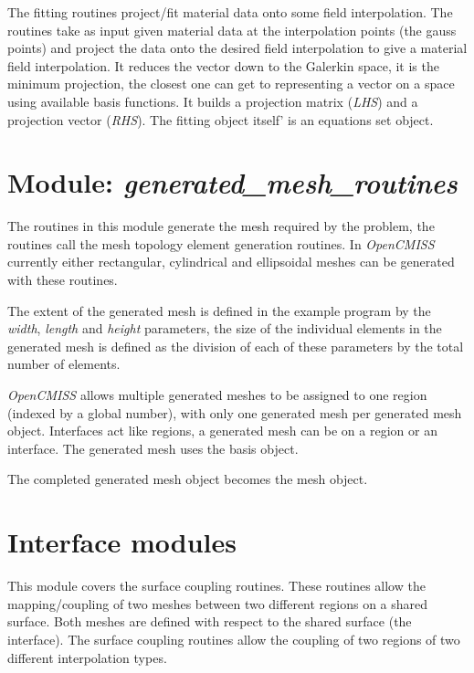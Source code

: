 The fitting routines project/fit material data onto some field interpolation.
The routines take as input given material data at the interpolation points (the
gauss points) and project the data onto the desired field interpolation to give
a material field interpolation. It reduces the vector down to the Galerkin
space, it is the minimum projection, the closest one can get to representing a 
vector on a space using available basis functions. It builds a projection matrix 
(\emph{LHS}) and a projection vector (\emph{RHS}). The fitting object itself' 
is an equations set object.


\section{Module: \emph{generated\_mesh\_routines}}
\label{sec:generatedmeshroutines}

The routines in this module generate the mesh required by the problem, the 
routines call the mesh topology element generation routines. In 
\emph{OpenCMISS} currently either rectangular, cylindrical and ellipsoidal 
meshes can be generated with these routines.

The extent of the generated mesh is defined in the example program by the 
\emph{width}, \emph{length} and \emph{height} parameters, the size of the 
individual elements in the generated mesh is defined as the division of each 
of these parameters by the total number of elements.

\emph{OpenCMISS} allows multiple generated meshes to be assigned to one region 
(indexed by a global number), with only one generated mesh per generated mesh 
object. Interfaces act like regions, a generated mesh can be on a region or an
interface. The generated mesh uses the basis object.

The completed generated mesh object becomes the mesh object.


\section{Interface modules}
\label{sec:interfacemodules}

This module covers the surface coupling routines. These routines allow the 
mapping/coupling of two meshes between two different regions on a shared
surface. Both meshes are defined with respect to the shared surface (the 
interface). The surface coupling routines allow the coupling of two regions 
of two different interpolation types. 

